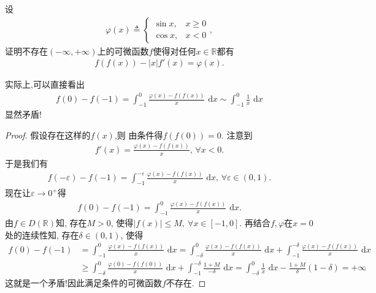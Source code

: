 \documentclass[../../main.tex]{subfiles}%
\begin{document}
\begin{example}
设
\begin{align*}
\varphi(x) \triangleq \begin{cases} 
\sin x, & x \geqslant 0 \\
\cos x, & x < 0 
\end{cases},
\end{align*}
证明不存在$(-\infty,+\infty)$上的可微函数$f$使得对任何$x \in \mathbb{R}$都有
\begin{align*}
f(f(x)) - |x| f'(x) = \varphi(x).
\end{align*}
\end{example}
\begin{note}
实际上,可以直接看出
\begin{align*}
f(0) - f(-1) = \int_{-1}^0 \frac{\varphi(x) - f(f(x))}{x} \,\,\mathrm{d}x \sim \int_{-1}^0 \frac{1}{x} \,\,\mathrm{d}x
\end{align*}
显然矛盾!
\end{note}
\begin{proof}
假设存在这样的$f(x)$,则
由条件得$f(f(0))=0$. 注意到
\begin{align*}
f'(x) = \frac{\varphi(x) - f(f(x))}{x}, \, \forall x < 0.
\end{align*}
于是我们有
\begin{align*}
f(-\varepsilon) - f(-1) = \int_{-1}^{-\varepsilon} \frac{\varphi(x) - f(f(x))}{x} \,\,\mathrm{d}x, \, \forall \varepsilon \in (0,1).
\end{align*}
现在让$\varepsilon \to 0^+$得
\begin{align*}
f(0) - f(-1) = \int_{-1}^0 \frac{\varphi(x) - f(f(x))}{x} \,\,\mathrm{d}x.
\end{align*}
由$f \in D(\mathbb{R})$知, 存在$M > 0$, 使得$|f(x)| \leqslant M,\ \forall x \in [-1,0]$. 再结合$f,\varphi$在$x=0$处的连续性知, 存在$\delta \in (0,1)$, 使得
\begin{align*}
f(0)-f(-1) &= \int_{-1}^0 \frac{\varphi(x) - f(f(x))}{x} \,\,\mathrm{d}x = \int_{-\delta}^0 \frac{\varphi(x) - f(f(x))}{x} \,\,\mathrm{d}x + \int_{-1}^{-\delta} \frac{\varphi(x) - f(f(x))}{x} \,\,\mathrm{d}x \\
&\geqslant \int_{-\delta}^0 \frac{\varphi(0) - f(f(0))}{x} \,\,\mathrm{d}x + \int_{-1}^{-\delta} \frac{1 + M}{-\delta} \,\,\mathrm{d}x = \int_{-\delta}^0 \frac{1}{x} \,\,\mathrm{d}x - \frac{1 + M}{\delta}(1 - \delta) = +\infty
\end{align*}
这就是一个矛盾!因此满足条件的可微函数$f$不存在.
\end{proof}
\end{document}
